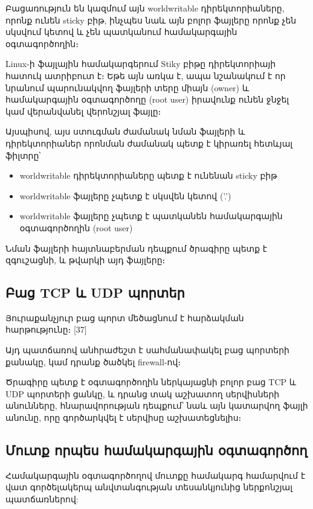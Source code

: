\documentclass[a4paper,12pt]{article}
\begin{document}
\begin{sloppypar}
Բացառություն են կազմում այն worldwritable դիրեկտորիաները, որոնք ունեն
sticky բիթ, ինչպես նաև այն բոլոր ֆայլերը որոնք չեն սկսվում կետով և չեն
պատկանում համակարգային օգտագործողին։

Linux-ի ֆայլային համակարգերում Stiky բիթը դիրեկտորիայի հատուկ ատրիբուտ է։
Եթե այն առկա է, ապա նշանակում է որ նրանում պարունակվող ֆայլերի տերը միայն (owner)
և համակարգային օգտագործողը (root user) իրավունք ունեն ջնջել կամ վերանվանել
վերոնշյալ ֆայլը։

Այսպիսով, այս ստուգման ժամանակ նման ֆայլերի և դիրեկտորիաներ որոնման ժամանակ
պետք է կիրառել հետևյալ ֆիլտրը՝

\begin{itemize}
\item worldwritable դիրեկտորիաները պետք է ունենան sticky բիթ
\item worldwritable ֆայլերը չպետք է սկսվեն կետով ('.')
\item worldwritable ֆայլերը չպետք է պատկանեն համակարգային օգտագործողին
	(root user)
\end{itemize}

Նման ֆայլերի հայտնաբերման դեպքում ծրագիրը պետք է զգուշացնի,
և թվարկի այդ ֆայլերը։


\subsection{Բաց TCP և UDP պորտեր}


Յուրաքանչյուր բաց պորտ մեծացնում է հարձակման հարթությունը։ [37]

Այդ պատճառով անհրաժեշտ է սահմանափակել բաց պորտերի քանակը,
կամ դրանք ծածկել firewall-ով։

Ծրագիրը պետք է օգտագործողին ներկայացնի բոլոր բաց 
TCP և UDP պորտերի ցանկը, և դրանց տակ աշխատող սերվիսների
անունները, հնարավորության դեպքում՝ նաև այն կատարվող
ֆայլի անունը, որը գործարկվել է սերվիսը աշխատեցնելիս։


\subsection{Մուտք որպես համակարգային օգտագործող}


Համակարգային օգտագործողով մուտքը համակարգ համարվում է վատ
գործելակերպ անվտանգության տեսանկյունից ներքոնշյալ պատճառներով:


\end{sloppypar}
\end{document}
